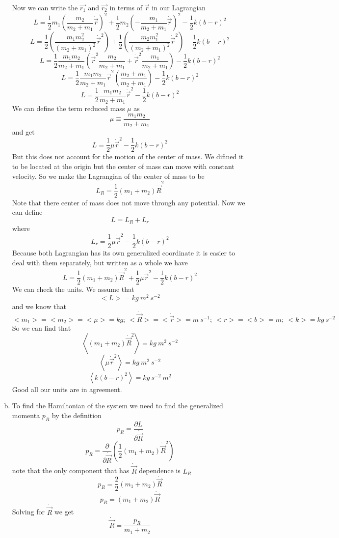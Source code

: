 \documentclass[11pt]{article}
\numberwithin{equation}{section}
\begin{document}
\begin{enumerate}[(a)]
Now we can write the $\vec{r_1}$ and $\vec{r_2}$ in terms of $\vec{r}$ in our Lagrangian
$$L = \frac{1}{2}m_1\left(\frac{m_2}{m_2+m_1}\dot{\vec{r}}\right)^2+ \frac{1}{2}m_2\left(-\frac{m_1}{m_2 + m_1}\dot{\vec{r}}\right)^2 - \frac{1}{2}k\left(b-r\right)^2$$
$$L = \frac{1}{2}\left(\frac{m_1m_2^2}{(m_2+m_1)^2}\dot{\vec{r}}^2\right)+ \frac{1}{2}\left(\frac{m_2m_1^2}{(m_2 + m_1)^2}\dot{\vec{r}}^2\right) - \frac{1}{2}k\left(b-r\right)^2$$
$$L = \frac{1}{2}\frac{m_1m_2}{m_2+m_1} \left(\dot{\vec{r}}^2\frac{m_2}{m_2 + m_1}+\dot{\vec{r}}^2\frac{m_1}{m_2 + m_1}\right) - \frac{1}{2}k\left(b-r\right)^2$$
$$L = \frac{1}{2}\frac{m_1m_2}{m_2+m_1} \dot{\vec{r}}^2\left(\frac{m_2+m_1}{m_2 + m_1}\right) - \frac{1}{2}k\left(b-r\right)^2$$
$$L = \frac{1}{2}\frac{m_1m_2}{m_2+m_1} \dot{\vec{r}}^2 - \frac{1}{2}k\left(b-r\right)^2$$
We can define the term reduced mass $\mu$ as
$$\mu \equiv \frac{m_1m_2}{m_2+m_1}$$
and get
$$L = \frac{1}{2}\mu \dot{\vec{r}}^2 - \frac{1}{2}k\left(b-r\right)^2$$
But this does not account for the motion of the center of mass. We difined it to be located at the origin but the center of mass can move with constant velocity. 
So we make the Lagrangian of the center of mass to be
$$L_R = \frac{1}{2}(m_1+m_2)\dot{\vec{R}}^2$$
Note that there center of mass does not move through any potential.
Now we can define
$$L = L_R + L_r$$ 
where
$$L_r = \frac{1}{2}\mu \dot{\vec{r}}^2 - \frac{1}{2}k\left(b-r\right)^2$$
Because both Lagrangian has its own generalized coordinate it is easier to deal with them separately, but written as a whole we have
$$L= \frac{1}{2}(m_1+m_2)\dot{\vec{R}}^2 + \frac{1}{2}\mu \dot{\vec{r}}^2 - \frac{1}{2}k\left(b-r\right)^2$$
We can check the units. We assume that 
$$<L> = kg\ m^2\ s^{-2}$$
and we know that
$$<m_1> = <m_2> = <\mu> = kg;\ <\dot{\vec{R}}>= <\dot{\vec{r}}> = m\ s^{-1};\ <r> = <b> = m;\ <k> = kg\ s^{-2}$$
So we can find that 
$$\left<(m_1+m_2)\dot{\vec{R}}^2\right> = kg\ m^2\ s^{-2}$$
$$\left<\mu \dot{\vec{r}}^2\right>=kg\ m^2\ s^{-2}$$
$$\left<k\left(b-r\right)^2\right> = kg\ s^{-2}\ m^2$$
Good all our units are in agreement.
\item
To find the Hamiltonian of the system we need to find the generalized momenta $p_R$ by the definition
$$p_R = \frac{\partial L}{\partial \dot{\vec{R}}}$$
$$p_R = \frac{\partial }{\partial \dot{\vec{R}}}\left(\frac{1}{2}(m_1+m_2)\dot{\vec{R}}^2\right)$$
note that the only component that has $\dot{\vec{R}}$ dependence is $L_R$
$$p_R = \frac{2}{2}(m_1+m_2)\dot{\vec{R}}$$
$$p_R = (m_1+m_2)\dot{\vec{R}}$$
Solving for $\dot{\vec{R}}$ we get
\begin{equation}
\dot{\vec{R}} = \frac{p_R}{m_1+m_2}
\label{pR}
\end{equation}


\end{enumerate}
\end{document}
